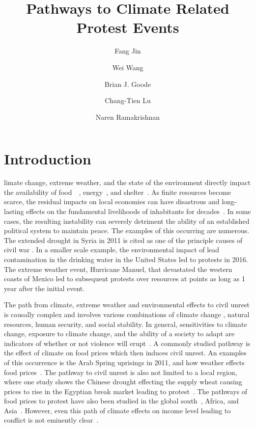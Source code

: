 \documentclass[9pt,twocolumn,twoside]{pnas-new}
\title{Pathways to Climate Related Protest Events}
\author[a,1]{Fang Jin}
\author[a]{Wei Wang}
\author[a]{Brian J. Goode}
\author[a]{Chang-Tien Lu}
\author[a]{Naren Ramakrishnan}
\affil[a]{Discovery Analytics Center (Dept. of Computer Science), Virginia Tech - NCR, Arlington, VA 22203}
\begin{document}
\verticaladjustment{-2pt}

\maketitle
\thispagestyle{firststyle}
\section{Introduction}
limate change, extreme weather, and the state of the environment directly impact the availability of food~\cite{RW3}~\cite{akil2014effects}, energy~\cite{mitigation2011ipcc}, and shelter~\cite{warner2009search}.
As finite resources become scarce, the residual impacts on local economies can have disastrous and long-lasting effects on the fundamental livelihoods of inhabitants for decades~\cite{le2001political}.
In some cases, the resulting instability can severely detriment the ability of an established political system to maintain peace.
The examples of this occurring are numerous.
The extended drought in Syria in 2011 is cited as one of the principle causes of civil war \cite{gleick2014water,kelley2015climate}.
In a smaller scale example, the environmental impact of lead contamination in the drinking water in the United States led to protests in 2016.
The extreme weather event, Hurricane Manuel, that devastated the western coasts of Mexico led to subsequent protests over resources at points as long as 1 year after the initial event.


The path from climate, extreme weather and environmental effects to civil unrest is causally complex \cite{hsiang2011civil,RW5} and involves various combinations of climate change \cite{burke2014climate}, natural resources, human security, and social stability.
In general, sensitivities to climate change, exposure to climate change, and the ability of a society to adapt are indicators of whether or not violence will erupt~\cite{RW9}.
A commonly studied pathway is the effect of climate on food prices which then induces civil unrest.
An examples of this occurrence is the Arab Spring uprisings in 2011, and how weather effects food prices~\cite{RW2}.
The pathway to civil unrest is also not limited to a local region, where one study shows the Chinese drought effecting the supply wheat causing prices to rise in the Egyptian break market leading to protest~\cite{RW1}.
The pathways of food prices to protest have also been studied in the global south~\cite{RW4}, Africa, and Asia~\cite{wischnath2014climate,RW6}.
However, even this path of climate effects on income level leading to conflict is not eminently clear~\cite{RW10}.
\end{document}
